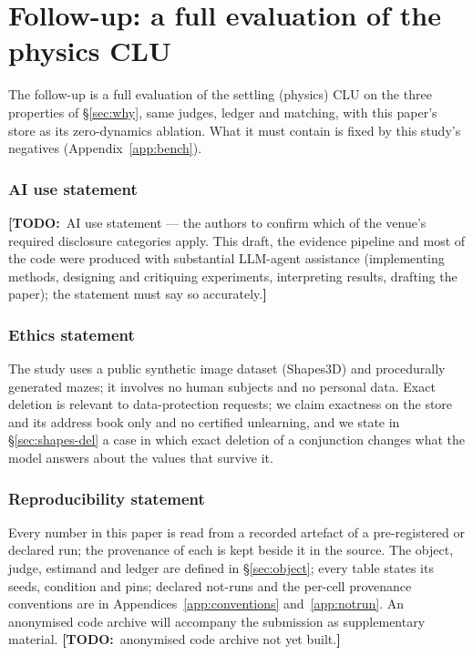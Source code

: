 \documentclass{article} %
\newcommand{\TODO}[1]{{\color{orange}\textbf{[TODO:}~#1\textbf{]}}}
\begin{document}
\section{Follow-up: a full evaluation of the physics CLU}
\label{sec:followup}

The follow-up is a full evaluation of the settling (physics) CLU on the three properties of
\S\ref{sec:why}, same judges, ledger and matching, with this paper's store as its zero-dynamics
ablation. What it must contain is fixed by this study's negatives (Appendix~\ref{app:bench}).

\subsubsection*{AI use statement}
\TODO{AI use statement --- the authors to confirm which of the venue's required disclosure categories
apply. This draft, the evidence pipeline and most of the code were produced with substantial LLM-agent
assistance (implementing methods, designing and critiquing experiments, interpreting results,
drafting the paper); the statement must say so accurately.}

\subsubsection*{Ethics statement}
The study uses a public synthetic image dataset (Shapes3D) and procedurally generated mazes; it
involves no human subjects and no personal data. Exact deletion is relevant to data-protection
requests; we claim exactness on the store and its address book only and no certified unlearning, and
we state in \S\ref{sec:shapes-del} a case in which exact deletion of a conjunction changes what the
model answers about the values that survive it.

\subsubsection*{Reproducibility statement}
Every number in this paper is read from a recorded artefact of a pre-registered or declared run;
the provenance of each is kept beside it in the source. The object, judge, estimand and ledger are
defined in \S\ref{sec:object}; every table states its seeds, condition and pins; declared
not-runs and the per-cell provenance conventions are in
Appendices~\ref{app:conventions} and~\ref{app:notrun}. An anonymised code archive will accompany the
submission as supplementary material. \TODO{anonymised code archive not yet built.}
\end{document}
